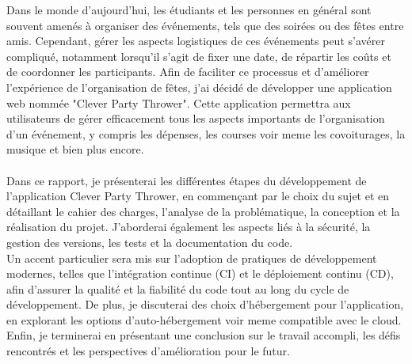 Dans le monde d'aujourd'hui, les étudiants et les personnes en général sont souvent amenés à organiser des événements, tels que des soirées ou des fêtes entre amis.
Cependant, gérer les aspects logistiques de ces événements peut s'avérer compliqué, notamment lorsqu'il s'agit de fixer une date, de répartir les coûts et de coordonner les participants.
Afin de faciliter ce processus et d'améliorer l'expérience de l'organisation de fêtes, j'ai décidé de développer une application web nommée "Clever Party Thrower".
Cette application permettra aux utilisateurs de gérer efficacement tous les aspects importants de l'organisation d'un événement,
y compris les dépenses, les courses voir meme les covoiturages, la musique et bien plus encore.\\\\

Dans ce rapport, je présenterai les différentes étapes du développement de l'application Clever Party Thrower,
en commençant par le choix du sujet et en détaillant le cahier des charges, l'analyse de la problématique, la conception et la réalisation du projet.
J'aborderai également les aspects liés à la sécurité, la gestion des versions, les tests et la documentation du code.\\
Un accent particulier sera mis sur l'adoption de pratiques de développement modernes, telles que l'intégration continue (CI) et le déploiement continu (CD), afin d'assurer la qualité et la fiabilité du code tout au long du cycle de développement.
De plus, je discuterai des choix d'hébergement pour l'application, en explorant les options d'auto-hébergement voir meme compatible avec le cloud.\\

Enfin, je terminerai en présentant une conclusion sur le travail accompli, les défis rencontrés et les perspectives d'amélioration pour le futur.